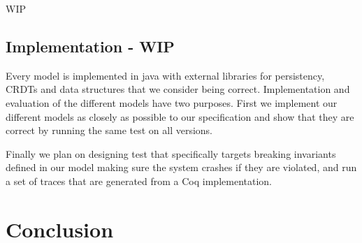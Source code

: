 \documentclass[systeme]{compas2022}
\begin{document}
WIP


\subsection{Implementation - WIP}

Every model is implemented in java with external libraries for persistency, CRDTs and data structures that we consider being correct.
Implementation and evaluation of the different models have two purposes.
First we implement our different models as closely as possible to our specification and show that they are correct by running the same test on all versions.

Finally we plan on designing test that specifically targets breaking invariants defined in our model making sure the system crashes if they are violated, and run a set of traces that are generated from a Coq implementation.



\section{Conclusion}



\end{document}
